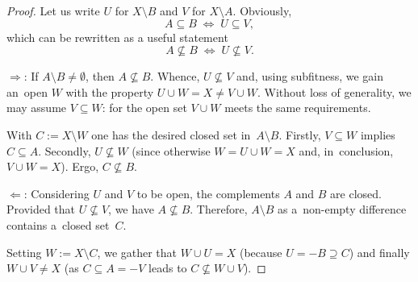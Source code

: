 \begin{proof}
  Let us write $U$ for $X\setminus B$ and $V$ for $X\setminus A$.
  Obviously,
  \[
    A\subseteq B \; \Leftrightarrow \; U\subseteq V,
  \]
  which can be rewritten as a useful statement
  \[
    A\not\subseteq B \; \Leftrightarrow \; U\not\subseteq V.
  \]

  $\Rightarrow$: If $A\setminus B \ne \emptyset$, then $A\not\subseteq B$.
  Whence, $U\not\subseteq V$ and, using subfitness, we gain an~open $W$ with
  the property $U \cup W = X \ne V \cup W$. 
  Without loss of generality, we may assume $V\subseteq W$: for the open set $V
  \cup W$ meets the same requirements.

  With $C := X \setminus W$ one has the desired closed set in~$A\setminus B$.
  Firstly, $V\subseteq W$ implies $C\subseteq A$.
  Secondly, $U\not\subseteq W$ (since otherwise $W = U \cup W = X$ and,
  in~conclusion, $V \cup W = X$).
  Ergo, $C\not\subseteq B$.

  $\Leftarrow$: Considering $U$ and $V$ to be open, the complements $A$ and $B$
  are closed.
  Provided that $U\not\subseteq V$, we have $A\not\subseteq B$.
  Therefore, $A \setminus B$ as a~non-empty difference contains a~closed
  set~$C$.

  Setting $W := X \setminus C$, we gather that $W \cup U = X$ (because $U =
  \minus B \supseteq C$) and finally $W \cup V \ne X$ (as $C\subseteq A =
  \minus V$ leads to $C\not\subseteq W \cup V$).
\end{proof}
